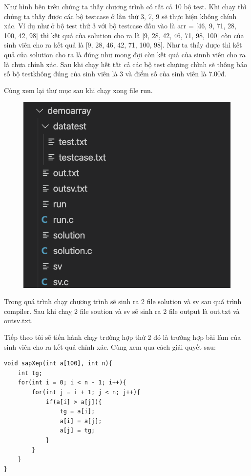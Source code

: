 \documentclass[12pt,a4paper]{article}
\begin{document}
Như hình bên trên chúng ta thấy chương trình có tất cả 10 bộ test. Khi chạy thì chúng ta thấy được các bộ testcase ở lần thứ 3, 7, 9 sẽ thực hiện không chính xác. Ví dụ như ở bộ test thứ 3 với bộ testcase đầu vào là arr = [46, 9, 71, 28, 100, 42, 98] thì kết quả của solution cho ra là [9, 28, 42, 46, 71, 98, 100] còn của sinh viên cho ra kết quả là [9, 28, 46, 42, 71, 100, 98]. Như ta thấy được thì kết quả của solution cho ra là đúng như mong đợi còn kết quả của sinnh viên cho ra là chưa chính xác. Sau khi chạy hết tất cả các bộ test chương chình sẽ thông báo số bộ testkhông đúng của sinh viên là 3 và điểm số của sinh viên là 7.00đ.

Cùng xem lại thư mục sau khi chạy xong file run.

\begin{figure}[ht]
\begin{center}
\includegraphics[scale=.3]{hinhanh/cautrucsauchayrunarray.png}
\end{center}
\end{figure}

Trong quá trình chạy chương trình sẽ sinh ra 2 file solution và sv sau quá trình compiler. Sau khi chaỵ 2 file soution và sv sẽ sinh ra 2 file output là out.txt và outsv.txt.

Tiếp theo tôi sẽ tiến hành chạy trường hợp thứ 2 đó là trường hợp bài làm của sinh viên cho ra kết quả chính xác. Cùng xem qua cách giải quyết sau:

\begin{lstlisting}
void sapXep(int a[100], int n){
    int tg;
    for(int i = 0; i < n - 1; i++){
        for(int j = i + 1; j < n; j++){
            if(a[i] > a[j]){
                tg = a[i];
                a[i] = a[j];
                a[j] = tg;        
            }
        }
    }
}
\end{lstlisting}
\end{document}
